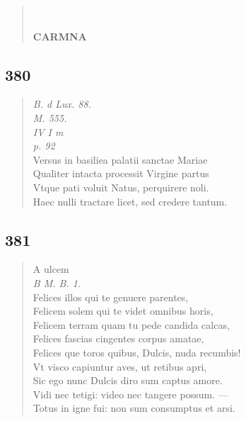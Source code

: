\documentclass[11pt, a4paper]{report}
\begin{document}
\begin{verse}
        ﻿\pagebreak 
     \marginpar{[000]} \begin{center} \textbf{CARMNA} \end{center}
      \end{verse}
  
            \subsection*{380}
      \begin{verse}
      \textit{B. d Lux. 88.} \\ \textit{M. 555.} \\ \textit{IV I m} \\ \textit{p. 92} \\ Versus in basiliea palatii sanctae Mariae \\ Qualiter intacta processit Virgine partus \\ Vtque pati voluit Natus, perquirere noli. \\ Haec nulli tractare licet, sed credere tantum. \\ 
      \end{verse}
  
            \subsection*{381}
      \begin{verse}
       \lbrack A ulcem \rbrack  \\ \textit{B M. B. 1.} \\ Felices illos qui te genuere parentes, \\ Felicem solem qui te videt omnibus horis, \\ Felicem terram quam tu pede candida calcas, \\ Felices fascias cingentes corpus amatae, \\ Felices \lbrack que \rbrack  toros quibus, Dulcis, nuda recumbis! \\ Vt visco capiuntur aves, ut retibus apri, \\ Sic ego nunc Dulcis diro sum captus amore. \\ Vidi nec tetigi: video nec tangere possum. — \\ Totus in igne fui: non sum consumptus et arsi. \\ 
      \end{verse}
  
\end{document}
